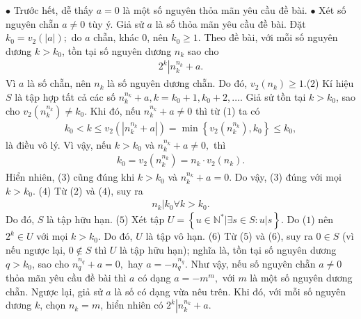 \begin{multicols}{2}
	\vskip 0.05cm
	$\bullet$ Trước hết, dễ thấy $a = 0$ là một số nguyên thỏa mãn yêu cầu đề bài.
	\vskip 0.05cm
	$\bullet$ Xét số nguyên chẵn $a \ne  0$ tùy ý.
	\vskip 0.05cm
	Giả sử $a$ là số thỏa mãn yêu cầu đề bài.
	\vskip 0.05cm
	Đặt ${k_0} = {v_2}\left( {|a|} \right);$  do $a$ chẵn, khác $0$, nên $k_0 \ge 1$.
	\vskip 0.05cm  
	Theo đề bài, với mỗi số nguyên dương $k > k_0$,  tồn tại số nguyên dương $n_k$   sao cho
	\begin{align*}
		{2^k}\left| {n_k^{{n_k}} + a} \right.. \tag{$1$}
	\end{align*}
	Vì $a$ là số chẵn, nên $n_k$  là số nguyên dương chẵn. Do đó, ${v_2}\left( {{n_k}} \right) \ge 1.$\hfill   ($2$)
	\vskip 0.05cm
	Kí hiệu $S$ là tập hợp tất cả các số  $n_k^{{n_k}} + a, k = {k_0} + 1,{k_0} + 2, \ldots $. 
	\vskip 0.05cm
	Giả sử tồn tại $k > k_0$, sao cho ${v_2}\left( {n_k^{{n_k}}} \right) \ne {k_0}.$  Khi đó, nếu $n_k^{{n_k}} + a \ne 0$  thì từ ($1$) ta có
	\begin{align*}
		{k_0} < k \le {v_2}\left( {\left| {n_k^{{n_k}} + a} \right|} \right) = \min \left\{ {{v_2}\left( {n_k^{{n_k}}} \right),{k_0}} \right\} \le {k_0},
	\end{align*}
	là điều vô lý. Vì vậy, nếu $k>k_0$  và $n_k^{{n_k}} + a \ne 0,$  thì
	\begin{align*}
		{k_0} = {v_2}\left( {n_k^{{n_k}}} \right) = {n_k} \cdot {v_2}\left( {{n_k}} \right). \tag{$3$}
	\end{align*}
	Hiển nhiên, ($3$) cũng đúng khi $k>k_0$  và  $n_k^{{n_k}} + a = 0.$ Do vậy, ($3$) đúng với mọi $k > {k_0}.$                   \hfill ($4$)
	\vskip 0.05cm
	Từ ($2$) và ($4$), suy ra
	\begin{align*}
		{n_k}\left| {{k_0}} \right.\forall k > {k_0}.
	\end{align*}
	Do đó, $S$ là tập hữu hạn.       \hfill ($5$)
	\vskip 0.05cm
	Xét tập  $U = \left\{ {u \in \mathbb{N^*}\left| {\exists s \in S:u|s} \right.} \right\}.$
	\vskip 0.05cm
	Do ($1$) nên  $2^k \in U$ với mọi $k > k_0$.  Do đó, $U$ là tập vô hạn.                                                    \hfill             ($6$)
	\vskip 0.05cm
	Từ ($5$) và ($6$), suy ra $0 \in S$  (vì nếu ngược lại, $0 \notin S$  thì $U$ là tập hữu hạn); nghĩa là, tồn tại số nguyên dương $q > k_0$,  sao cho $n_q^{{n_q}} + a = 0,$  hay $a =  - n_q^{{n_q}}.$
	\vskip 0.05cm  
	Như vậy, nếu số nguyên chẵn $a \ne  0$ thỏa mãn yêu cầu đề bài thì $a$ có dạng $a =  - {m^m},$  với $m$ là một số nguyên dương chẵn.
	\vskip 0.05cm
	Ngược lại, giả sử $a$ là số có dạng vừa nêu trên. Khi đó, với mỗi số nguyên dương $k$, chọn  $n_k = m$, hiển nhiên có ${2^k}\left| {n_k^{{n_k}} + a} \right..$

\end{multicols}
